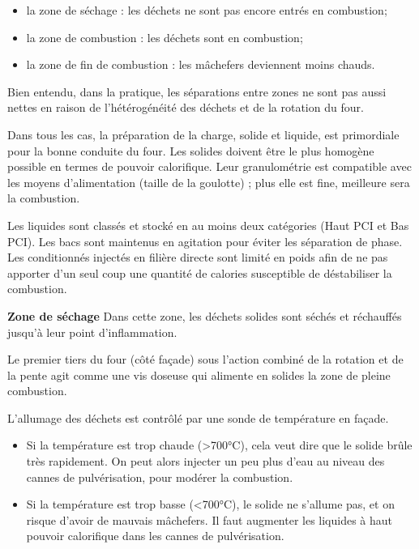 \begin{itemize}
\item  la zone de séchage : les déchets ne sont pas encore entrés en combustion;
\item  la zone de combustion : les déchets sont en combustion;
\item  la zone de fin de combustion : les mâchefers deviennent moins chauds.

\end{itemize}

Bien entendu, dans la pratique, les séparations entre zones ne sont pas aussi nettes en raison de l’hétérogénéité des déchets et de la rotation du four.
\vspace{0.3cm}

Dans tous les cas, la préparation de la charge, solide et liquide, est primordiale pour la bonne conduite du four.
Les solides doivent être le plus homogène possible en termes de pouvoir calorifique. Leur granulométrie est compatible avec les moyens d’alimentation (taille de la goulotte) ; plus elle est fine, meilleure sera la combustion.

\vspace{0.3cm}

Les liquides sont classés et stocké en au moins deux catégories (Haut PCI et Bas PCI). Les bacs sont maintenus en agitation pour éviter les séparation de phase.
Les conditionnés injectés en filière directe sont limité en poids afin de ne pas apporter d’un seul coup une quantité de calories susceptible de déstabiliser la combustion.


\vspace{0.3cm}
\textbf{Zone de séchage}
\vspace{0.3cm}
Dans cette zone, les déchets solides sont séchés et réchauffés jusqu’à leur point d’inflammation.

Le premier tiers du four (côté façade) sous l’action combiné de la rotation et de la pente agit comme une vis doseuse qui alimente en solides la zone de pleine combustion.

L’allumage des déchets est contrôlé par une sonde de température en façade.

\begin{itemize}
\item	Si la température est trop chaude (>700°C), cela veut dire que le solide brûle très rapidement. On peut alors injecter un peu plus d’eau au niveau des cannes de pulvérisation, pour modérer la combustion.
\item Si la température est trop basse (<700°C), le solide ne s’allume pas, et on risque d’avoir de mauvais mâchefers. Il faut augmenter les liquides à haut pouvoir calorifique dans les cannes de pulvérisation.

\end{itemize}

